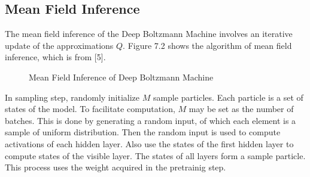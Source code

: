 \documentclass[12pt]{article}
\begin{document}
\subsection{Mean Field Inference}
The mean field inference of the Deep Boltzmann Machine involves an iterative update of the approximations $Q$. Figure 7.2 shows the algorithm of mean field inference, which is from [5].
\begin{figure}[!t]
\centering
{}
\caption{Mean Field Inference of Deep Boltzmann Machine}
\label{fig5}
\end{figure}
In sampling step, randomly initialize $M$ sample particles. Each particle is a set of states of the model. To facilitate computation, $M$ may be set as the number of batches. This is done by generating a random input, of which each element is a sample of uniform distribution. Then the random input is used to compute activations of each hidden layer. Also use the states of the first hidden layer to compute states of the visible layer. The states of all layers form a sample particle. This process uses the weight acquired in the pretrainig step.
\end{document}
